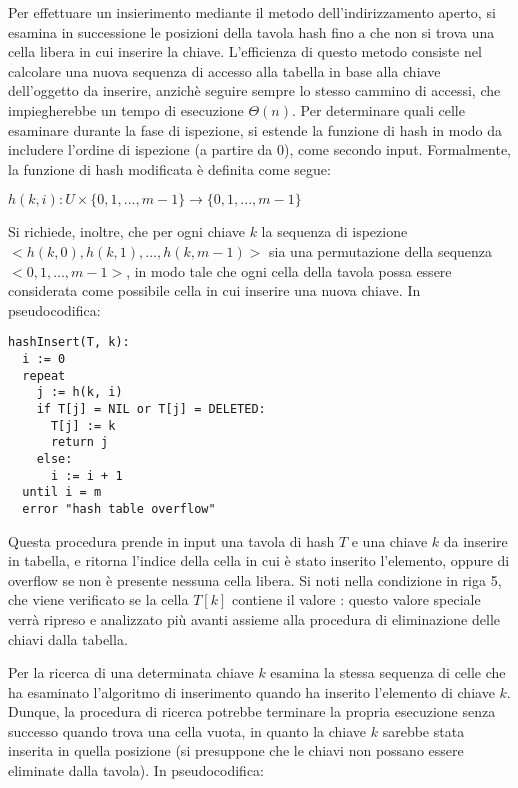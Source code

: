 Per effettuare un insierimento mediante il metodo dell'indirizzamento aperto, si esamina in successione le posizioni della tavola hash fino a che non si trova una cella libera in cui inserire la chiave. L'efficienza di questo metodo consiste nel calcolare una nuova sequenza di accesso alla tabella in base alla chiave dell'oggetto da inserire, anzichè seguire sempre lo stesso cammino di accessi, che impiegherebbe un tempo di esecuzione \(\Theta(n)\). Per determinare quali celle esaminare durante la fase di ispezione, si estende la funzione di hash in modo da includere l'ordine di ispezione (a partire da 0), come secondo input. Formalmente, la funzione di hash modificata è definita come segue:

\(h(k,i):U\times \{0,1,...,m-1\} \to \{0,1,...,m-1\}\)

\noindent Si richiede, inoltre, che per ogni chiave \(k\) la sequenza di ispezione \(<h(k,0), h(k,1),..., h(k,m-1)>\) sia una permutazione della sequenza \(<0,1,...,m-1>\), in modo tale che ogni cella della tavola possa essere considerata come possibile cella in cui inserire una nuova chiave. In pseudocodifica:

\begin{lstlisting}
hashInsert(T, k):
  i := 0
  repeat
    j := h(k, i)
    if T[j] = NIL or T[j] = DELETED:
      T[j] := k
      return j
    else:
      i := i + 1
  until i = m
  error "hash table overflow"
\end{lstlisting}

Questa procedura prende in input una tavola di hash \(T\) e una chiave \(k\) da inserire in tabella, e ritorna l'indice della cella in cui è stato inserito l'elemento, oppure  di overflow se non è presente nessuna cella libera. Si noti nella condizione in riga 5, che viene verificato se la cella \(T[k]\) contiene il valore : questo valore speciale verrà ripreso e analizzato più avanti assieme alla procedura di eliminazione delle chiavi dalla tabella.

\vspace{10pt}

Per la ricerca di una determinata chiave \(k\) esamina la stessa sequenza di celle che ha esaminato l'algoritmo di inserimento quando ha inserito l'elemento di chiave \(k\). Dunque, la procedura di ricerca potrebbe terminare la propria esecuzione senza successo quando trova una cella vuota, in quanto la chiave \(k\) sarebbe stata inserita in quella posizione (si presuppone che le chiavi non possano essere eliminate dalla tavola). In pseudocodifica:

